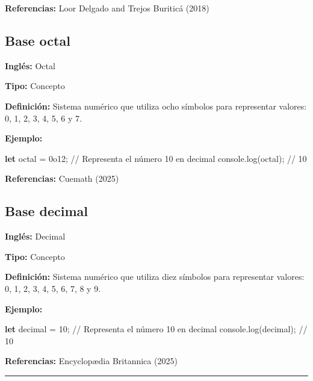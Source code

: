 \documentclass[
  letterpaper,
  DIV=11,
  numbers=noendperiod]{scrreprt}
\newenvironment{Shaded}{\begin{snugshade}}{\end{snugshade}}
\newcommand{\BaseNTok}[1]{\textcolor[rgb]{0.68,0.00,0.00}{#1}}
\newcommand{\BuiltInTok}[1]{\textcolor[rgb]{0.00,0.23,0.31}{#1}}
\newcommand{\CommentTok}[1]{\textcolor[rgb]{0.37,0.37,0.37}{#1}}
\newcommand{\DecValTok}[1]{\textcolor[rgb]{0.68,0.00,0.00}{#1}}
\newcommand{\FunctionTok}[1]{\textcolor[rgb]{0.28,0.35,0.67}{#1}}
\newcommand{\KeywordTok}[1]{\textcolor[rgb]{0.00,0.23,0.31}{\textbf{#1}}}
\newcommand{\NormalTok}[1]{\textcolor[rgb]{0.00,0.23,0.31}{#1}}
\newcommand{\OperatorTok}[1]{\textcolor[rgb]{0.37,0.37,0.37}{#1}}
\let\oldsubsection\subsection
\renewcommand{\subsection}{\phantomsection\oldsubsection}
\begin{document}
\textbf{Referencias:} Loor Delgado and Trejos Buriticá (2018)

\subsection*{Base octal}\label{glos-octal}

\textbf{Inglés:} Octal

\textbf{Tipo:} Concepto

\textbf{Definición:} Sistema numérico que utiliza ocho símbolos para
representar valores: 0, 1, 2, 3, 4, 5, 6 y 7.

\textbf{Ejemplo:}

\begin{Shaded}
\begin{Highlighting}[]
\KeywordTok{let}\NormalTok{ octal }\OperatorTok{=} \BaseNTok{0o12}\OperatorTok{;} \CommentTok{// Representa el número 10 en decimal}
\BuiltInTok{console}\OperatorTok{.}\FunctionTok{log}\NormalTok{(octal)}\OperatorTok{;} \CommentTok{// 10}
\end{Highlighting}
\end{Shaded}

\textbf{Referencias:} Cuemath (2025)

\subsection*{Base decimal}\label{glos-decimal}

\textbf{Inglés:} Decimal

\textbf{Tipo:} Concepto

\textbf{Definición:} Sistema numérico que utiliza diez símbolos para
representar valores: 0, 1, 2, 3, 4, 5, 6, 7, 8 y 9.

\textbf{Ejemplo:}

\begin{Shaded}
\begin{Highlighting}[]
\KeywordTok{let}\NormalTok{ decimal }\OperatorTok{=} \DecValTok{10}\OperatorTok{;} \CommentTok{// Representa el número 10 en decimal}
\BuiltInTok{console}\OperatorTok{.}\FunctionTok{log}\NormalTok{(decimal)}\OperatorTok{;} \CommentTok{// 10}
\end{Highlighting}
\end{Shaded}

\textbf{Referencias:} Encyclopædia Britannica (2025)

\begin{center}\rule{0.5\linewidth}{0.5pt}\end{center}
\end{document}
